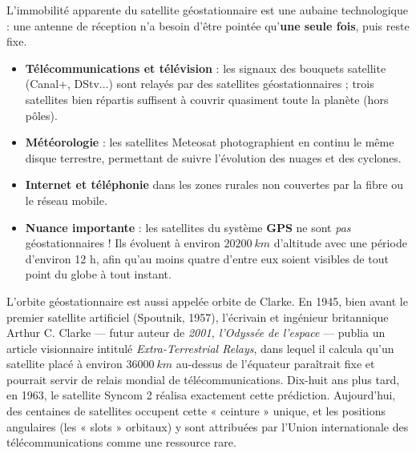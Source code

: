 \documentclass[11pt]{article}
\newcommand{\cle}[1]{{\popxbold\color{popdark}#1}}
\begin{document}
L'immobilité apparente du satellite géostationnaire est une aubaine technologique : une antenne de réception n'a besoin d'être pointée qu'\textbf{une seule fois}, puis reste fixe.

\begin{itemize}
\item \textbf{Télécommunications et télévision} : les signaux des bouquets satellite (Canal+, DStv...) sont relayés par des satellites géostationnaires ; trois satellites bien répartis suffisent à couvrir quasiment toute la planète (hors pôles).
\item \textbf{Météorologie} : les satellites Meteosat photographient en continu le même disque terrestre, permettant de suivre l'évolution des nuages et des cyclones.
\item \textbf{Internet et téléphonie} dans les zones rurales non couvertes par la fibre ou le réseau mobile.
\item \textbf{Nuance importante} : les satellites du système \textbf{GPS} ne sont \emph{pas} géostationnaires ! Ils évoluent à environ $\SI{20200}{km}$ d'altitude avec une période d'environ 12 h, afin qu'au moins quatre d'entre eux soient visibles de tout point du globe à tout instant.
\end{itemize}

\begin{savaistu}
L'orbite géostationnaire est aussi appelée \cle{orbite de Clarke}. En 1945, bien avant le premier satellite artificiel (Spoutnik, 1957), l'écrivain et ingénieur britannique Arthur C. Clarke — futur auteur de \emph{2001, l'Odyssée de l'espace} — publia un article visionnaire intitulé \emph{Extra-Terrestrial Relays}, dans lequel il calcula qu'un satellite placé à environ $\SI{36000}{km}$ au-dessus de l'équateur paraîtrait fixe et pourrait servir de relais mondial de télécommunications. Dix-huit ans plus tard, en 1963, le satellite Syncom 2 réalisa exactement cette prédiction. Aujourd'hui, des centaines de satellites occupent cette « ceinture » unique, et les positions angulaires (les « slots » orbitaux) y sont attribuées par l'Union internationale des télécommunications comme une ressource rare.
\end{savaistu}
\end{document}
